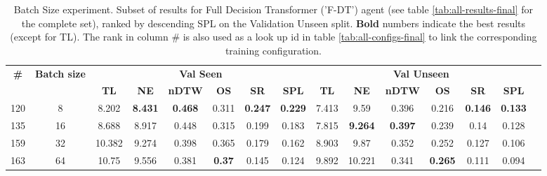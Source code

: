 \begin{table}
\centering
\caption{\label{tab:f_dt_batch_test}Batch Size experiment. Subset of results for Full Decision Transformer ('F-DT') agent (see table \ref{tab:all-results-final} for the complete set), ranked by descending SPL on the Validation Unseen split. \textbf{Bold} numbers indicate the best results (except for TL). The rank in column \# is also used as a look up id in table \ref{tab:all-configs-final} to link the corresponding training configuration.}
\begin{tabular}{@{\hskip3pt}c@{\hskip3pt}c@{\hskip3pt}c@{\hskip3pt}c@{\hskip3pt}c@{\hskip3pt}c@{\hskip3pt}c@{\hskip3pt}c@{\hskip3pt}c@{\hskip3pt}c@{\hskip3pt}c@{\hskip3pt}c@{\hskip3pt}c@{\hskip3pt}c@{\hskip3pt}c}
\toprule
                                  \textbf{\#} & \textbf{Batch size} & \multicolumn{6}{c}{\textbf{Val Seen}} & \multicolumn{6}{c}{\textbf{Val Unseen}} \\
\cmidrule(l){3-8}\cmidrule(l){9-14}\textbf{~} &          \textbf{~} &       \textbf{TL} &     \textbf{NE} &   \textbf{nDTW} &    \textbf{OS} &     \textbf{SR} &    \textbf{SPL} &         \textbf{TL} &     \textbf{NE} &   \textbf{nDTW} &     \textbf{OS} &     \textbf{SR} &    \textbf{SPL} \\
\midrule
                                          120 &                   8 &             8.202 &  \textbf{8.431} &  \textbf{0.468} &          0.311 &  \textbf{0.247} &  \textbf{0.229} &               7.413 &            9.59 &           0.396 &           0.216 &  \textbf{0.146} &  \textbf{0.133} \\
                                          135 &                  16 &             8.688 &           8.917 &           0.448 &          0.315 &           0.199 &           0.183 &               7.815 &  \textbf{9.264} &  \textbf{0.397} &           0.239 &            0.14 &           0.128 \\
                                          159 &                  32 &            10.382 &           9.274 &           0.398 &          0.365 &           0.179 &           0.162 &               8.903 &            9.87 &           0.352 &           0.252 &           0.127 &           0.106 \\
                                          163 &                  64 &             10.75 &           9.556 &           0.381 &  \textbf{0.37} &           0.145 &           0.124 &               9.892 &          10.221 &           0.341 &  \textbf{0.265} &           0.111 &           0.094 \\
\bottomrule
\end{tabular}
\end{table}
